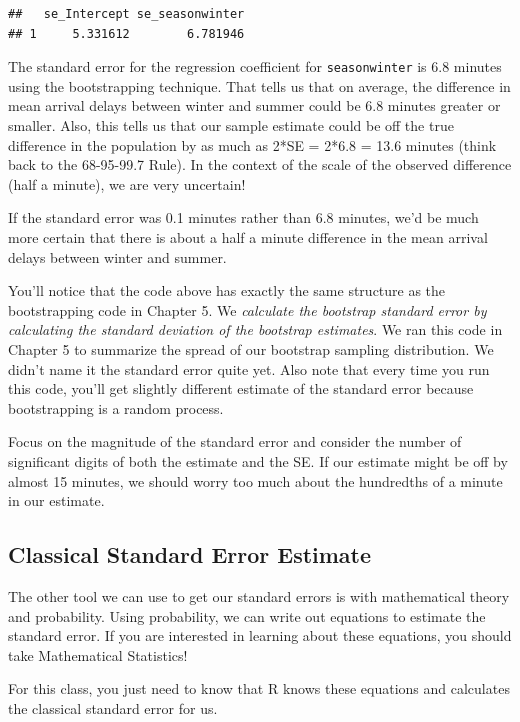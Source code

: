 \documentclass[
]{book}
\begin{document}
\begin{verbatim}
##   se_Intercept se_seasonwinter
## 1     5.331612        6.781946
\end{verbatim}

The standard error for the regression coefficient for \texttt{seasonwinter} is 6.8 minutes using the bootstrapping technique. That tells us that on average, the difference in mean arrival delays between winter and summer could be 6.8 minutes greater or smaller. Also, this tells us that our sample estimate could be off the true difference in the population by as much as 2*SE = 2*6.8 = 13.6 minutes (think back to the 68-95-99.7 Rule). In the context of the scale of the observed difference (half a minute), we are very uncertain!

If the standard error was 0.1 minutes rather than 6.8 minutes, we'd be much more certain that there is about a half a minute difference in the mean arrival delays between winter and summer.

You'll notice that the code above has exactly the same structure as the bootstrapping code in Chapter 5. We \emph{calculate the bootstrap standard error by calculating the standard deviation of the bootstrap estimates}. We ran this code in Chapter 5 to summarize the spread of our bootstrap sampling distribution. We didn't name it the standard error quite yet. Also note that every time you run this code, you'll get slightly different estimate of the standard error because bootstrapping is a random process.

Focus on the magnitude of the standard error and consider the number of significant digits of both the estimate and the SE. If our estimate might be off by almost 15 minutes, we should worry too much about the hundredths of a minute in our estimate.

\subsection{Classical Standard Error Estimate}\label{classical-standard-error-estimate}

The other tool we can use to get our standard errors is with mathematical theory and probability. Using probability, we can write out equations to estimate the standard error. If you are interested in learning about these equations, you should take Mathematical Statistics!

For this class, you just need to know that R knows these equations and calculates the classical standard error for us.
\end{document}
